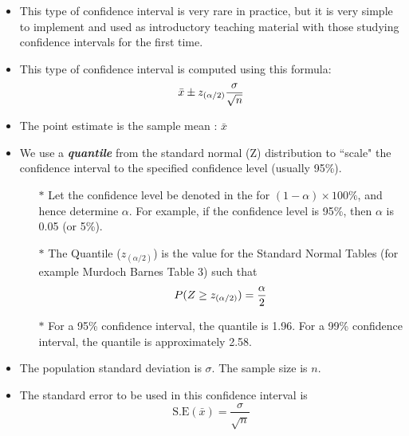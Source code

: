 \documentclass[a4paper,12pt]{article}
\begin{document}
\begin{itemize}
\item This type of confidence interval is very rare in practice, but it is very simple to implement and used as introductory 
teaching material with those studying confidence intervals for the first time.
\item This type of confidence interval is computed using this formula:
\[ \bar{x} \pm z_{(\alpha/2)}{\sigma \over \sqrt{n}} \]


\item The point estimate is the sample mean : $\bar{x}$

\item We use a \textbf{\textit{quantile}} from the standard normal (Z) distribution to ``scale"
the confidence interval to the specified confidence level (usually 95\%).

\begin{itemize}
    \item[$\ast$] Let the confidence level be denoted in the for $(1-\alpha)\times 100\%$, and hence determine $\alpha$.
For example, if the confidence level is 95\%, then $\alpha$ is 0.05 (or 5\%).

\item[$\ast$] The Quantile ($z_{(\alpha/2)}$) is the value for the Standard Normal Tables (for example Murdoch Barnes Table 3) such that
\[ P(Z \geq z_{(\alpha/2)}) = {\alpha \over 2}\]

\item[$\ast$] For a 95\% confidence interval, the quantile is 1.96. For a 99\% confidence interval, the quantile is approximately 2.58. 
\end{itemize}


\item The population standard deviation is $\sigma$. The sample size is $n$.
\item The standard error to be used in this confidence interval is
\[ \mbox{S.E}(\bar{x}) = \frac{\sigma}{\sqrt{n}}\]
\end{itemize}





\end{document}
